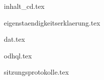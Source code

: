 {inhalt_cd.tex}

{eigenstaendigkeitserklaerung.tex}

{dat.tex}

{odhql.tex}

\label{app:odhql-referenz}
\addtocounter{chapter}{1}


{sitzungsprotokolle.tex}